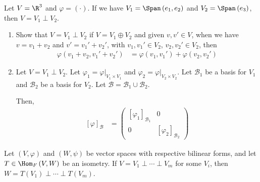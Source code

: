 \documentclass[10pt]{mypackage}
\begin{document}
  \begin{example}
    Let $V = \R^3$ and $\varphi = \left(\cdot\right)$. If we have $V_1 = \Span\left(e_1,e_2\right)$ and $V_2 = \Span\left(e_3\right)$, then $V = V_1 \perp V_2$.
  \end{example}
  \begin{exercise}\hfill
    \begin{enumerate}[(1)]
      \item Show that $V = V_1\perp V_2$ if $V = V_1\oplus V_2$ and given $v,v'\in V$, when we have $v = v_1 + v_2$ and $v' = v_1' + v_2'$, with $v_1,v_1'\in V_2$, $v_2,v_2'\in V_2$, then
        \begin{align*}
          \varphi\left(v_1+ v_2,v_1' + v_2'\right) &= \varphi\left(v_1,v_1'\right) + \varphi\left(v_2,v_2'\right)
        \end{align*}
      \item Let $V = V_1 \perp V_2$. Let $\varphi_1 = \varphi|_{V_1\times V_1}$ and $\varphi_2 = \varphi|_{V_2\times V_2}$. Let $\mathcal{B}_1$ be a basis for $V_1$ and $\mathcal{B}_2$ be a basis for $V_2$. Let $\mathcal{B} = \mathcal{B}_1 \cup \mathcal{B}_2$.\newline

        Then,
        {\renewcommand{\arraystretch}{1.5}
        \begin{align*}
          \left[\varphi\right]_{\mathcal{B}} &= \begin{pmatrix}\left[\varphi_1\right]_{\mathcal{B}_1} & 0 \\ 0 & \left[\varphi_2\right]_{\mathcal{B}_2}\end{pmatrix} 
        \end{align*}
        }
    \end{enumerate}
  \end{exercise}
  \begin{proposition}
    Let $\left(V,\varphi\right)$ and $\left(W,\psi\right)$ be vector spaces with respective bilinear forms, and let $T\in \Hom_{F}\left(V,W\right)$ be an isometry. If $V = V_1\perp\cdots\perp V_m$ for some $V_i$, then $W = T\left(V_1\right)\perp\cdots\perp T\left(V_m\right)$.
  \end{proposition}
\end{document}
